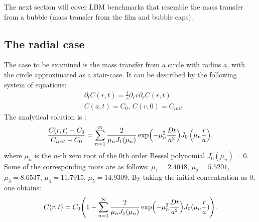 \documentclass{article}
\newcommand{\beq}{\begin{equation}}
\newcommand{\feq}{\end{equation}}
\begin{document}
The next section will cover LBM benchmarks that resemble the mass transfer from a bubble 
(mass transfer from the film  and bubble caps).

\subsection{The radial case}
The case to be examined  is the mass transfer from a circle with radius $a$, with the circle approximated as a stair-case. It
can be described by the following system of equations:
\beq
\begin{aligned}
&\partial_t C(r,t)=\frac{1}{r}\partial_r r \partial_r C(r,t)\\
&C(a,t)=C_0,\,C(r,0)=C_{init}
\end{aligned}
\feq 
The analytical solution is \cite{chemical-correlations}:
\beq
\frac{C(r,t)-C_{0}}{C_{init}-C_{0}}=\sum_{n=1}^{\infty}{\frac{2}{\mu_n
J_1(\mu_n)}\exp\Bigl(-\mu_n^2 \frac{D t}{a^2} \Bigr)J_0\left(\mu_n \frac{r}{a}\right)},
\feq
where $\mu_n$ is the $n$-th zero root of the $0$th order Bessel polynomial $J_0(\mu_n)=0$. Some of
the corresponding roots are as follows: $\mu_1=2.4048$, $\mu_2=5.5201$, $\mu_3=8.6537$,
$\mu_4=11.7915$, $\mu_5=14.9309$.
By taking the initial concentration as $0$, one obtains:
\beq
\label{eq:analytical:profile:radial:case}
C(r,t)=C_0 \Biggl(1 - \sum_{n=1}^{\infty}{\frac{2}{\mu_n
J_1(\mu_n)}\exp\Bigl(-\mu_n^2 \frac{D t}{a^2} \Bigr)J_0(\mu_n \frac{r}{a})}\Biggr).
\feq
\end{document}
